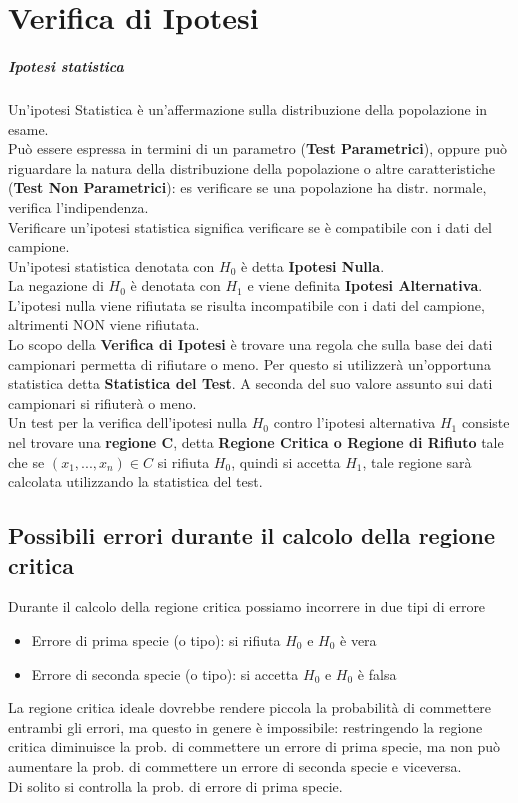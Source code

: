 \chapter{Verifica di Ipotesi}
\paragraph*{Ipotesi statistica} Un'ipotesi Statistica è un'affermazione sulla
distribuzione della popolazione in esame.
\\ Può essere espressa in termini di un parametro (\textbf{Test Parametrici}), oppure
può riguardare la natura della distribuzione della popolazione o altre
caratteristiche (\textbf{Test Non Parametrici}): es verificare se una popolazione
ha distr. normale, verifica l'indipendenza.
\\ Verificare un'ipotesi statistica significa verificare se è compatibile con i dati
del campione.
\\ Un'ipotesi statistica denotata con $H_0$ è detta \textbf{Ipotesi Nulla}.
\\ La negazione di $H_0$ è denotata con $H_1$ e viene definita \textbf{Ipotesi Alternativa}.
L'ipotesi nulla viene rifiutata se risulta incompatibile con i dati del campione,
altrimenti NON viene rifiutata.
\\ Lo scopo della \textbf{Verifica di Ipotesi} è trovare una regola che sulla base dei
dati campionari permetta di rifiutare o meno. Per questo si utilizzerà un'opportuna
statistica detta \textbf{Statistica del Test}. A seconda del suo valore assunto sui dati
campionari si rifiuterà o meno.
\\ Un test per la verifica dell'ipotesi nulla $H_0$ contro l'ipotesi alternativa 
$H_1$ consiste nel trovare una \textbf{regione C}, detta \textbf{Regione Critica o Regione di Rifiuto}
tale che se $(x_1, ..., x_n) \in C$ si rifiuta $H_0$, quindi si accetta $H_1$,
tale regione sarà calcolata utilizzando la statistica del test.
\section{Possibili errori durante il calcolo della regione critica}
Durante il calcolo della regione critica possiamo incorrere in due tipi di errore
\begin{itemize}
    \item Errore di prima specie (o tipo): si rifiuta $H_0$ e $H_0$ è vera
    \item Errore di seconda specie (o tipo): si accetta $H_0$ e $H_0$ è falsa
\end{itemize}
La regione critica ideale dovrebbe rendere piccola la probabilità di commettere
entrambi gli errori, ma questo in genere è impossibile: restringendo la regione
critica diminuisce la prob. di commettere un errore di prima specie, ma non
può aumentare la prob. di commettere un errore di seconda specie e viceversa.
\\ Di solito si controlla la prob. di errore di prima specie.
